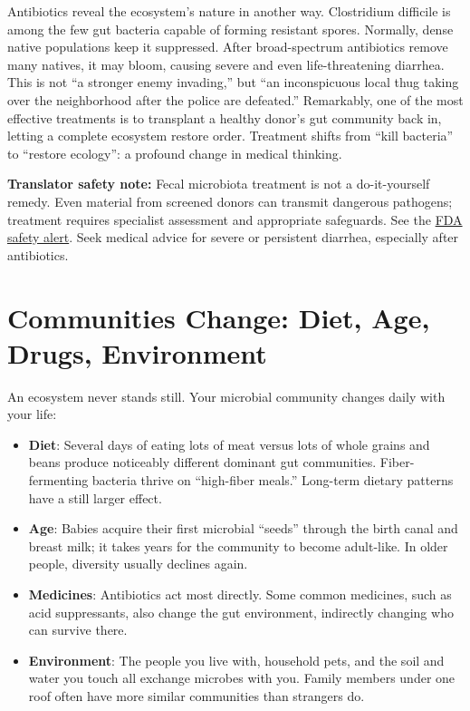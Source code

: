 Antibiotics reveal the ecosystem's nature in another way. Clostridium difficile is among the few gut bacteria capable of forming resistant spores. Normally, dense native populations keep it suppressed. After broad-spectrum antibiotics remove many natives, it may bloom, causing severe and even life-threatening diarrhea. This is not ``a stronger enemy invading,'' but ``an inconspicuous local thug taking over the neighborhood after the police are defeated.'' Remarkably, one of the most effective treatments is to transplant a healthy donor's gut community back in, letting a complete ecosystem restore order. Treatment shifts from ``kill bacteria'' to ``restore ecology'': a profound change in medical thinking.

\textbf{Translator safety note:} Fecal microbiota treatment is not a do-it-yourself remedy. Even material from screened donors can transmit dangerous pathogens; treatment requires specialist assessment and appropriate safeguards. See the \href{https://www.fda.gov/safety/medical-product-safety-information/fecal-microbiota-transplantation-safety-alert-risk-serious-adverse-events-likely-due-transmission}{FDA safety alert}. Seek medical advice for severe or persistent diarrhea, especially after antibiotics.

\section{Communities Change: Diet, Age, Drugs, Environment}

An ecosystem never stands still. Your microbial community changes daily with your life:

\begin{itemize}[itemsep=2pt]
\item \textbf{Diet}: Several days of eating lots of meat versus lots of whole grains and beans produce noticeably different dominant gut communities. Fiber-fermenting bacteria thrive on ``high-fiber meals.'' Long-term dietary patterns have a still larger effect.
\item \textbf{Age}: Babies acquire their first microbial ``seeds'' through the birth canal and breast milk; it takes years for the community to become adult-like. In older people, diversity usually declines again.
\item \textbf{Medicines}: Antibiotics act most directly. Some common medicines, such as acid suppressants, also change the gut environment, indirectly changing who can survive there.
\item \textbf{Environment}: The people you live with, household pets, and the soil and water you touch all exchange microbes with you. Family members under one roof often have more similar communities than strangers do.
\end{itemize}

